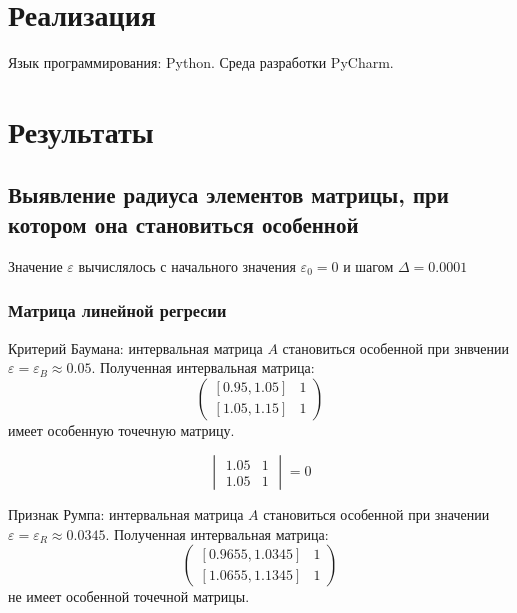 \documentclass[a4paper,12pt]{article}
\begin{document}
    \section{Реализация}
    Язык программирования: Python. Среда разработки PyCharm.

    \section{Результаты}
    \subsection{Выявление радиуса элементов матрицы, при котором она становиться особенной}
    Значение $ \varepsilon $ вычислялось с начального значения $ \varepsilon_{0} = 0 $ и шагом $ \Delta = 0.0001 $

    \subsubsection{Матрица линейной регресии}
    Критерий Баумана: интервальная матрица \textbf{$ A $} становиться особенной при знвчении
    $ \varepsilon = \varepsilon_{B} \approx 0.05 $.
    Полученная интервальная матрица:
    \begin{equation}
        \begin{pmatrix}
            [0.95, 1.05] & 1\\
            [1.05, 1.15] & 1
        \end{pmatrix}
    \end{equation}
    имеет особенную точечную матрицу.

    \begin{equation}
        \begin{vmatrix}
            1.05 & 1\\
            1.05 & 1
        \end{vmatrix}
        = 0
    \end{equation}

    Признак Румпа: интервальная матрица \textbf{$ A $} становиться особенной при значении
    $ \varepsilon = \varepsilon_{R} \approx 0.0345 $.
    Полученная интервальная матрица:
    \begin{equation}
        \begin{pmatrix}
            [0.9655, 1.0345] & 1\\
            [1.0655, 1.1345] & 1
        \end{pmatrix}
    \end{equation}
    не имеет особенной точечной матрицы.
\end{document}
